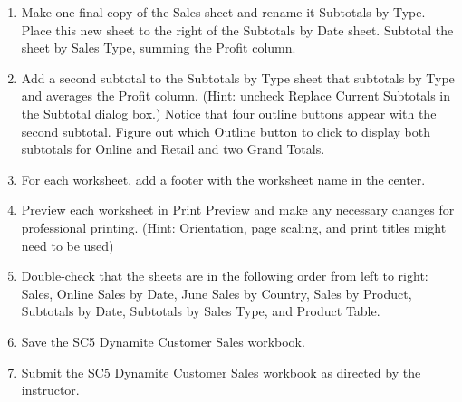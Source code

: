 \begin{enumerate}[resume]
	\item Make one final copy of the Sales sheet and rename it Subtotals by Type. Place this new sheet to the right of the Subtotals by Date sheet. Subtotal the sheet by Sales Type, summing the Profit column.
	\item Add a second subtotal to the Subtotals by Type sheet that subtotals by Type and averages the Profit column. (Hint: uncheck Replace Current Subtotals in the Subtotal dialog box.) Notice that four outline buttons appear with the second subtotal. Figure out which Outline button to click to display both subtotals for Online and Retail and two Grand Totals.
	\item For each worksheet, add a footer with the worksheet name in the center.
	\item Preview each worksheet in Print Preview and make any necessary changes for professional printing. (Hint: Orientation, page scaling, and print titles might need to be used)
	\item Double-check that the sheets are in the following order from left to right: Sales, Online Sales by Date, June Sales by Country, Sales by Product, Subtotals by Date, Subtotals by Sales Type, and Product Table.
	\item Save the SC5 Dynamite Customer Sales workbook.
	\item Submit the SC5 Dynamite Customer Sales workbook as directed by the instructor.
\end{enumerate}
